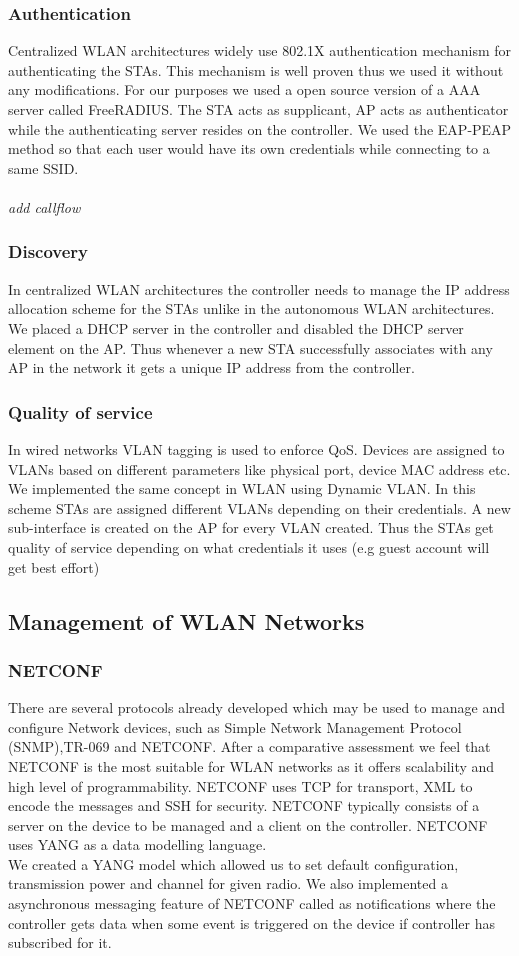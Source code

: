 \documentclass[12pt]{article}
\begin{document}
\subsubsection{Authentication}
Centralized WLAN architectures widely use 802.1X authentication mechanism for authenticating the STAs. This mechanism is well proven thus we used it without any modifications. For our purposes we used a open source version of a AAA server called FreeRADIUS. The STA acts as  supplicant, AP acts as authenticator while the authenticating server resides on the controller. We used the EAP-PEAP method so that each user would have its own credentials while connecting to a same SSID.\\
\\ \textit{add callflow}
\subsubsection{Discovery}
In centralized WLAN architectures the controller needs to manage the IP address allocation scheme for the STAs unlike in the autonomous WLAN architectures. We placed a DHCP server in the controller and disabled the DHCP server element on the AP. Thus whenever a new STA successfully associates with any AP in the network it gets a unique IP address from the controller.
\subsubsection{Quality of service}
In wired networks VLAN tagging is used to enforce QoS. Devices are assigned to VLANs based on different parameters like physical port, device MAC address etc. We implemented the same concept in WLAN using Dynamic VLAN.  In this scheme STAs are assigned different VLANs depending on their credentials. A new sub-interface is created on the AP for every VLAN created. Thus the STAs get quality of service depending on what credentials it uses (e.g guest account will get best effort)


\subsection{Management of WLAN Networks}
   \subsubsection{NETCONF}
    There are several protocols already developed which may be used to manage and configure Network devices, such as Simple Network Management Protocol (SNMP),TR-069 and NETCONF. After a comparative assessment we feel that NETCONF is the most suitable for WLAN networks as it offers scalability and high level of programmability. NETCONF uses TCP for transport, XML to encode the messages and SSH for security. NETCONF typically consists of a server on the device to be managed and a client on the controller. NETCONF uses YANG\cite{RFC7950} as a data modelling language.\\
    We created a YANG model which allowed us to set default configuration, transmission power and channel for given radio. We also implemented a asynchronous messaging feature of NETCONF called as notifications where the controller gets data when some event is triggered on the device if controller has subscribed for it.
\end{document}
